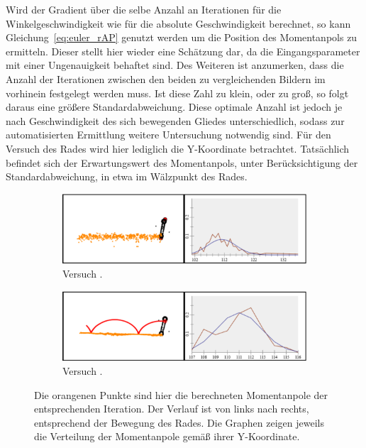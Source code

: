 Wird der Gradient über die selbe Anzahl an Iterationen für die Winkelgeschwindigkeit wie für die absolute Geschwindigkeit berechnet, so kann Gleichung~\ref{eq:euler_rAP} genutzt werden um die Position des Momentanpols zu ermitteln.
Dieser stellt hier wieder eine Schätzung dar, da die Eingangsparameter mit einer Ungenauigkeit behaftet sind.
Des Weiteren ist anzumerken, dass die Anzahl der Iterationen zwischen den beiden zu vergleichenden Bildern im vorhinein festgelegt werden muss.
Ist diese Zahl zu klein, oder zu groß, so folgt daraus eine größere Standardabweichung.
Diese optimale Anzahl ist jedoch je nach Geschwindigkeit des sich bewegenden Gliedes unterschiedlich, sodass zur automatisierten Ermittlung weitere Untersuchung notwendig sind.
Für den Versuch des Rades wird hier lediglich die Y-Koordinate betrachtet.
Tatsächlich befindet sich der Erwartungswert des Momentanpols, unter Berücksichtigung der Standardabweichung, in etwa im Wälzpunkt des Rades.

\begin{figure}
    \centering
    \begin{subfigure}[t]{0.45\textwidth}
        \includegraphics[width=\textwidth]{gfx/drehendes_rad_1.png}
        \caption{Versuch .}\label{fig:drehendes_rad_1}
    \end{subfigure}
    \begin{subfigure}[t]{0.45\textwidth}
        \includegraphics[width=\textwidth]{gfx/drehendes_rad_4.png}
        \caption{Versuch .}\label{fig:drehendes_rad_4}
    \end{subfigure}
    \caption[Versuche  und ]{Die orangenen Punkte sind hier die berechneten Momentanpole der entsprechenden Iteration. Der Verlauf ist von links nach rechts, entsprechend der Bewegung des Rades. Die Graphen zeigen jeweils die Verteilung der Momentanpole gemäß ihrer Y-Koordinate.}
    \label{fig:drehendes_rad_1_4}
\end{figure}


